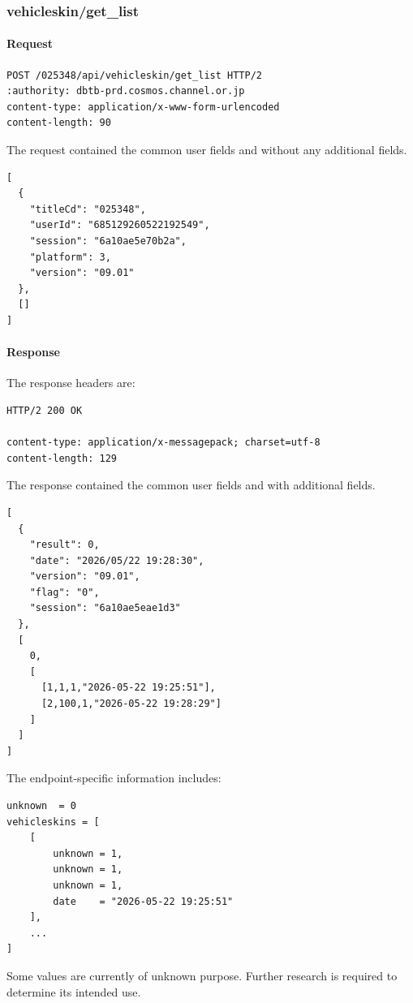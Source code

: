 \subsubsection{vehicleskin/get\_list}
\label{subsec:api_vehicleskin_get_list}

\paragraph{Request}

\begin{lstlisting}
POST /025348/api/vehicleskin/get_list HTTP/2
:authority: dbtb-prd.cosmos.channel.or.jp
content-type: application/x-www-form-urlencoded
content-length: 90
\end{lstlisting}

The request contained the common user fields and without any additional fields.

\begin{lstlisting}
[
  {
    "titleCd": "025348",
    "userId": "685129260522192549",
    "session": "6a10ae5e70b2a",
    "platform": 3,
    "version": "09.01"
  },
  []
]
\end{lstlisting}

\newpage

\paragraph{Response}

The response headers are:

\begin{lstlisting}
HTTP/2 200 OK

content-type: application/x-messagepack; charset=utf-8
content-length: 129
\end{lstlisting}

The response contained the common user fields and with additional fields.

\begin{lstlisting}
[
  {
    "result": 0,
    "date": "2026/05/22 19:28:30",
    "version": "09.01",
    "flag": "0",
    "session": "6a10ae5eae1d3"
  },
  [
    0,
    [
      [1,1,1,"2026-05-22 19:25:51"],
      [2,100,1,"2026-05-22 19:28:29"]
    ]
  ]
]
\end{lstlisting}

The endpoint-specific information includes:

\begin{lstlisting}
unknown  = 0
vehicleskins = [
    [
        unknown = 1,
        unknown = 1,
        unknown = 1,
        date    = "2026-05-22 19:25:51"
    ],
    ...
]
\end{lstlisting}

\begin{tcolorbox}[colback=yellow!10,colframe=orange!80!black,title=Warning]
Some values are currently of unknown purpose.
Further research is required to determine its intended use.
\end{tcolorbox}

\newpage